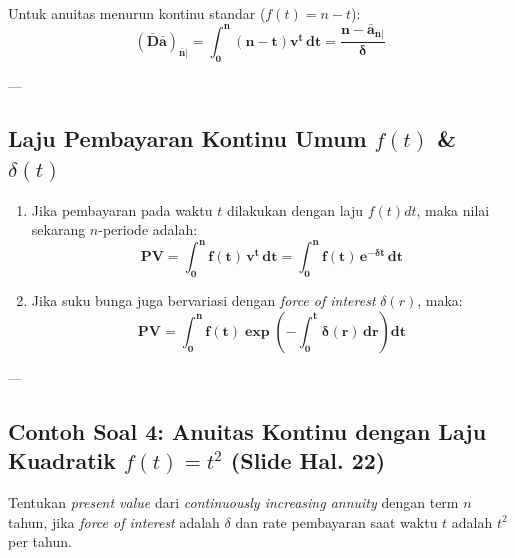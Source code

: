 \documentclass[11pt,a4paper]{article}
\begin{document}
Untuk anuitas menurun kontinu standar ($f(t) = n - t$):
\begin{equation}
    \mathbf{(\bar{D}\bar{a})_{\overline{n}|} = \int_0^n (n - t) v^t \, dt = \frac{n - \bar{a}_{\overline{n}|}}{\delta}}
\end{equation}

---

\subsection{Laju Pembayaran Kontinu Umum \texorpdfstring{$f(t)$}{f(t)} \& \texorpdfstring{$\delta(t)$}{delta(t)}}

\begin{definitionbox}
\begin{enumerate}
    \item Jika pembayaran pada waktu $t$ dilakukan dengan laju $f(t) dt$, maka nilai sekarang $n$-periode adalah:
    \begin{equation}
        \mathbf{PV = \int_0^n f(t) \, v^t \, dt = \int_0^n f(t) \, e^{-\delta t} \, dt}
    \end{equation}
    \item Jika suku bunga juga bervariasi dengan \textit{force of interest} $\delta(r)$, maka:
    \begin{equation}
        \mathbf{PV = \int_0^n f(t) \exp\left( -\int_0^t \delta(r) \, dr \right) dt}
    \end{equation}
\end{enumerate}
\end{definitionbox}

---

\subsection{Contoh Soal 4: Anuitas Kontinu dengan Laju Kuadratik \texorpdfstring{$f(t) = t^2$}{f(t) = t^2} (Slide Hal. 22)}

\begin{examplebox}
Tentukan \textit{present value} dari \textit{continuously increasing annuity} dengan term $n$ tahun, jika \textit{force of interest} adalah $\delta$ dan rate pembayaran saat waktu $t$ adalah $t^2$ per tahun.
\end{examplebox}
\end{document}

